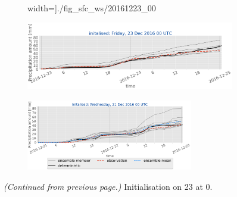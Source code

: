 \begin{figure}[H]
\begin{subfigure}[b]{0.75\textwidth}
		width=\textwidth]{./fig_sfc_ws/20161223_00}
		\caption{}\label{fig:res:sfc_ws23}
	\end{subfigure}
	\begin{subfigure}[b]{0.75\textwidth}
		\includegraphics[trim={0.cm 1.5cm 0cm 0cm},clip,
		width=\textwidth]{./fig_sfc_precip/20161223_00}
		\caption{}\label{fig:res:sfc_precip23}
	\end{subfigure}
	\begin{subfigure}[b]{0.8\textwidth}
		\centering
		\includegraphics[trim={5.5cm 0cm 5.cm 17.7cm},clip,
		width=0.8\textwidth]{./fig_sfc_precip/20161221_00_label}
	\end{subfigure}
    \caption{\textit{(Continued from previous page.)} Initialisation on \SI{23}{\dec} at \SI{0}{\UTC}. }
\end{figure}
%
